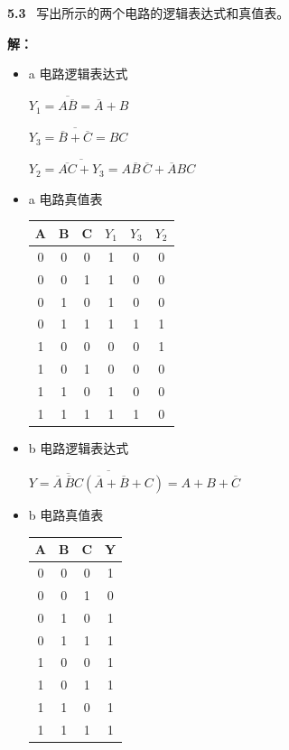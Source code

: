 \documentclass[10pt, a4paper]{article}
\newcommand{\question}[2]{
    \vspace{2ex}\noindent\textbf{#1}\ {\kaishu #2} \par\vspace{1ex}
}
\newcommand{\solution}[1]{
    \noindent\textbf{解：}{\songti #1} \par\vspace{3ex}
}
\begin{document}
\question{5.3}{
写出所示的两个电路的逻辑表达式和真值表。
}

\solution{
\begin{itemize}
	\item a 电路逻辑表达式
	
	$ Y_1 = \overline{A\overline{B}} = \overline{A} + B $

	$ Y_3 = \overline{\overline{B} + \overline{C}} = BC $

	$ Y_2 = \overline{\overline{AC} + Y_3} = A\overline{B}\,\overline{C} + \overline{A}BC$

	\item a 电路真值表

	\begin{table}[h]
		\centering
		\begin{tabular}{ccc|ccc}
		\toprule
		A & B & C & $Y_1$ & $Y_3$ & $Y_2$ \\
		\midrule
		0 & 0 & 0 & 1 & 0 & 0 \\
		0 & 0 & 1 & 1 & 0 & 0 \\
		0 & 1 & 0 & 1 & 0 & 0 \\
		0 & 1 & 1 & 1 & 1 & 1 \\
		1 & 0 & 0 & 0 & 0 & 1 \\
		1 & 0 & 1 & 0 & 0 & 0 \\
		1 & 1 & 0 & 1 & 0 & 0 \\
		1 & 1 & 1 & 1 & 1 & 0 \\
		\bottomrule
		\end{tabular} 
	\end{table}

	\item b 电路逻辑表达式
	
	$ Y = \overline{\overline{\overline{A}\,\overline{B}C}(\overline{A} + \overline{B} + C)} = A + B + \overline{C} $

	\item b 电路真值表

	\begin{table}[h]
		\centering
		\begin{tabular}{ccc|c}
		\toprule
		A & B & C & Y \\
		\midrule
		0 & 0 & 0 & 1 \\
		0 & 0 & 1 & 0 \\
		0 & 1 & 0 & 1 \\
		0 & 1 & 1 & 1 \\
		1 & 0 & 0 & 1 \\
		1 & 0 & 1 & 1 \\
		1 & 1 & 0 & 1 \\
		1 & 1 & 1 & 1 \\
		\bottomrule
		\end{tabular}
	\end{table}
\end{itemize}
}
\end{document}
